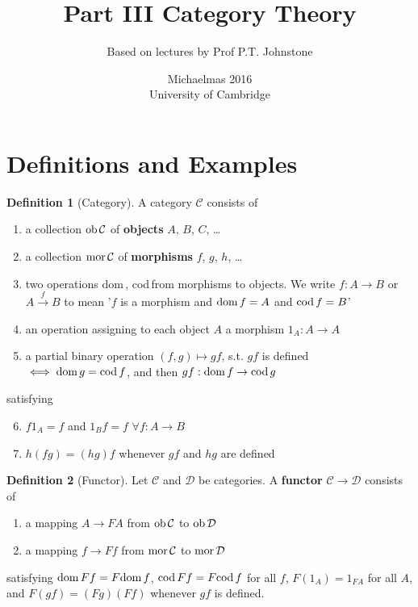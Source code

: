 \documentclass[a4paper]{article}
\title{Part III Category Theory}
\author{Based on lectures by Prof P.T. Johnstone}
\date{Michaelmas 2016\\University of Cambridge}
\theoremstyle{definition}
\newtheorem{definition}{Definition}
\theoremstyle{remark}
\theoremstyle{default}
\numberwithin{definition}{section}
\newcommand*\dom[1]{\textnormal{dom}\,#1}
\newcommand*\cod[1]{\textnormal{cod}\,#1}
\newcommand*\ob[1]{\textnormal{ob}\,#1}
\newcommand*\mor[1]{\textnormal{mor}\,#1}
\begin{document}
\maketitle
\tableofcontents
\newpage
\section{Definitions and Examples}
\begin{definition}[Category]
	A category $\mathcal{C}$ consists of 
	\begin{enumerate}[label=\alph*.]
		\item a collection $\ob{\mathcal{C}}$ of \textbf{objects} $A$, $B$, $C$, \dots
		\item a collection $\mor{\mathcal{C}}$ of \textbf{morphisms} $f$, $g$, $h$, \dots
		\item two operations \dom, \cod from morphisms to objects. We write $f:A\to B$ or $A\overset{f}{\to}B$ to mean '$f$ is a morphism and $\dom{f}=A$ and $\cod{f}=B$'
		\item an operation assigning to each object $A$ a morphism $1_A:A\to A$
		\item a partial binary operation $(f, g) \mapsto gf$, s.t. $gf$ is defined $\iff \dom{g}=\cod{f}$, and then $gf:\dom{f}\to\cod{g}$
	\end{enumerate}
	satisfying
	\begin{enumerate}[label=\alph*.]
		\setcounter{enumi}{5}
		\item $f 1_A = f$ and $1_B f=f$ $\forall f: A \to B$
		\item $h(fg) = (hg)f$ whenever $gf$ and $hg$ are defined
	\end{enumerate}
\end{definition}

\begin{definition}[Functor]
	Let $\mathcal{C}$ and $\mathcal{D}$ be categories. A \textbf{functor} $\mathcal{C}\to\mathcal{D}$ consists of
	\begin{enumerate}[label=\alph*.]
		\item a mapping $A \to FA$ from $\ob{\mathcal{C}}$ to $\ob{\mathcal{D}}$
		\item a mapping $f \to Ff$ from $\mor{\mathcal{C}}$ to $\mor{\mathcal{D}}$
	\end{enumerate}
	satisfying $\dom{Ff}=F\dom{f}$, $\cod{Ff}=F\cod{f}$ for all $f$, $F(1_A)=1_{FA}$ for all $A$, and $F(gf)=(Fg)(Ff)$ whenever $gf$ is defined.
\end{definition}
\end{document}
